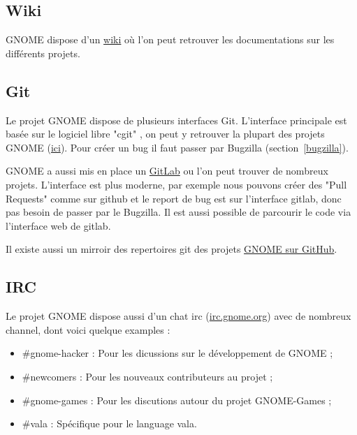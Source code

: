 \documentclass[12pt]{report}
\begin{document}

\subsection{Wiki}
\label{wiki}
GNOME dispose d'un \href{https://wiki.gnome.org/}{wiki} où l'on peut retrouver 
les documentations sur les différents projets.

\subsection{Git}
\label{git}

\label{cgit}
Le projet GNOME dispose de plusieurs interfaces Git. L'interface 
principale est basée sur le logiciel libre "cgit"
, on peut y retrouver la plupart des projets GNOME 
(\href{https://git.gnome.org/}{ici}). Pour créer un bug il faut passer par Bugzilla
(section~\ref{bugzilla}).

\label{gitlab}
GNOME a aussi mis en place un \href{https://gitlab.gnome.org/GNOME}{GitLab} 
ou l'on peut trouver de nombreux projets. L'interface est plus moderne,
par exemple nous pouvons créer des "Pull Requests" comme sur github
et le report de bug est sur l'interface gitlab, donc pas besoin de passer
par le Bugzilla. Il est aussi possible de parcourir le code via l'interface
web de gitlab.

\label{github}
Il existe aussi un mirroir des repertoires git des projets 
\href{https://github.com/GNOME}{GNOME sur GitHub}.

\subsection{IRC}
Le projet GNOME dispose aussi d'un chat irc (\href{irc.gnome.org}{irc.gnome.org})
avec de nombreux channel, dont voici quelque examples :
\begin{itemize}
\item \#gnome-hacker : Pour les dicussions sur le développement de GNOME ;
\item \#newcomers : Pour les nouveaux contributeurs au projet ;
\item \#gnome-games : Pour les discutions autour du projet GNOME-Games ;
\item \#vala : Spécifique pour le language vala.
\end{itemize}
\end{document}
